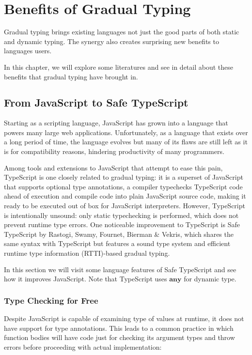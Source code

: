 
\renewcommand{\thechapter}{2}

\chapter{Benefits of Gradual Typing}

Gradual typing brings existing languages not just the good parts of both static and dynamic typing.
The synergy also creates surprising new benefits to languages users.

In this chapter, we will explore some literatures and see in detail about these benefits that gradual typing have brought in.

\section{From JavaScript to Safe TypeScript}

Starting as a scripting language, JavaScript has grown into a language
that powers many large web applications.
Unfortunately, as a language that exists over a long period of time,
the language evolves but many of its flaws are still left as it is for compatibility reasons,
hindering productivity of many programmers.

Among tools and extensions to JavaScript that attempt to ease this pain,
TypeScript is one closely related to gradual typing:
it is a superset of JavaScript that supports optional type annotations,
a compiler typechecks TypeScript code ahead of execution and compile code
into plain JavaScript source code, making it ready to be executed out of box
for JavaScript interpreters.
However, TypeScript is intentionally unsound: only static typechecking is performed,
which does not prevent runtime type errors.
One noticeable improvement to TypeScript is Safe TypeScript by Rastogi, Swamy, Fournet, Bierman \& Vekris, which shares the same syntax with TypeScript
but features a sound type system and efficient runtime type information (RTTI)-based
gradual typing.

In this section we will visit some language features of Safe TypeScript and see how it improves JavaScript. Note that TypeScript uses $\textbf{any}$ for dynamic type.

\subsection{Type Checking for Free}

Despite JavaScript is capable of examining type of values at runtime,
it does not have support for type annotations.
This leads to a common practice in which function bodies will have code
just for checking its argument types and throw errors before
proceeding with actual implementation:

